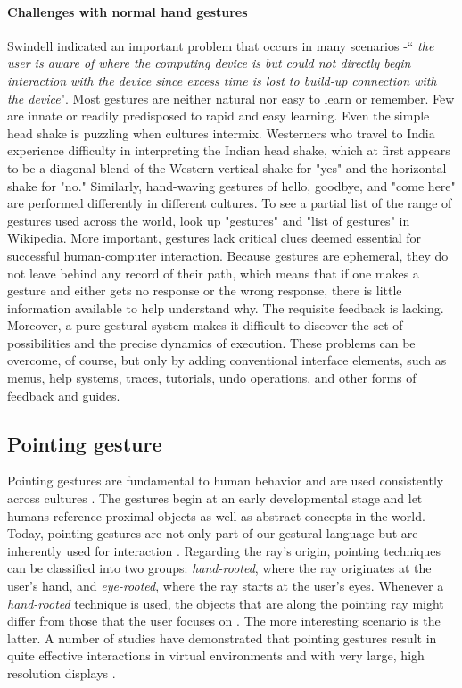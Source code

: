\paragraph{Challenges with normal hand gestures}
Swindell\cite{Swindells2002} indicated an important problem that occurs in many scenarios -`` \textit{the user is aware of where the computing device is but could not directly begin interaction with the device since excess time is lost to build-up connection with the device}". 
Most gestures are neither natural nor easy to learn or remember. Few are innate or readily predisposed to rapid and easy learning. Even the simple head shake is puzzling when cultures intermix. Westerners who travel to India experience difficulty in interpreting the Indian head shake, which at first appears to be a diagonal blend of the Western vertical shake for "yes" and the horizontal shake for "no." Similarly, hand-waving gestures of hello, goodbye, and "come here" are performed differently in different cultures. To see a partial list of the range of gestures used across the world, look up "gestures" and "list of gestures" in Wikipedia.
More important, gestures lack critical clues deemed essential for successful human-computer interaction. Because gestures are ephemeral, they do not leave behind any record of their path, which means that if one makes a gesture and either gets no response or the wrong response, there is little information available to help understand why. The requisite feedback is lacking. Moreover, a pure gestural system makes it difficult to discover the set of possibilities and the precise dynamics of execution. These problems can be overcome, of course, but only by adding conventional interface elements, such as menus, help systems, traces, tutorials, undo operations, and other forms of feedback and guides.


\subsection{Pointing gesture}
Pointing gestures are fundamental to human behavior \citep{Matthews2012} and are used consistently across cultures  \citep{McNeill2000}. The gestures begin at an early developmental stage \citep{Carpendale2010} and let humans reference proximal objects as well as abstract concepts in the world. Today, pointing gestures are not only part of our gestural language but are inherently used for interaction \citep{Nanayakkara2013a}. Regarding the ray's origin, pointing techniques can be classified into two groups: \textit{hand-rooted}, where the ray originates at the user's hand, and \textit{eye-rooted}, where the ray starts at the user's eyes. Whenever a \textit{hand-rooted} technique is used, the objects that are along the pointing ray might differ from those that the user focuses on \citep{Argelaguet2008}. The more interesting scenario is the latter.
A number of studies have demonstrated that pointing gestures result in quite effective interactions in virtual environments  \citep{Argelaguet2008} and with very large, high resolution displays \citep{Vogel2005}.

